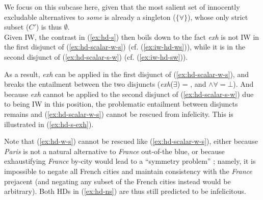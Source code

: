 	
	We focus on this subcase here, given that the most salient set of innocently excludable alternatives to \textit{some} is already a singleton ($\lbrace \forall \rbrace$), whose only strict subset ($C'$) is thus $\emptyset$.\\
	
	Given IW, the contrast in (\ref{ex:hd-s}) then boils down to the fact \textit{exh} is not IW in the first disjunct of (\ref{ex:hd-scalar-w-s}) (cf. (\ref{ex:iw-hd-ws})), while it is in the second disjunct of (\ref{ex:hd-scalar-s-w}) (cf. (\ref{ex:iw-hd-sw})).
	
	
	\begin{exe}
		\ex\label{ex:iw-hd-scalar}
		\begin{xlist}
			\label{ex:iw-hd-ws}
			\label{ex:iw-hd-sw}
		\end{xlist}
	\end{exe}
	
	As a result, \textit{exh} can be applied in the first disjunct of (\ref{ex:hd-scalar-w-s}), and breaks the entailment between the two disjuncts (\textit{exh}($\exists$) = \sbna, and \sbna $\wedge \forall = \bot$). And because \textit{exh} cannot be applied to the second disjunct of (\ref{ex:hd-scalar-s-w}) due to being IW in this position, the problematic entailment between disjuncts remains and (\ref{ex:hd-scalar-w-s}) cannot be rescued from infelicity. This is illustrated in (\ref{ex:hd-s-exh}).
	
	\begin{exe}
		\ex\label{ex:hd-s-exh}
		\begin{xlist}
			\label{ex:hd-scalar-w-s-exh}
			\label{ex:hd-scalar-s-w-exh}
		\end{xlist}
	\end{exe}
	
	Note that (\ref{ex:hd-w-s}) cannot be rescued like (\ref{ex:hd-scalar-w-s}), either because \textit{Paris} is not a natural alternative to \textit{France} out-of-the blue, or because exhaustifying \textit{France} by-city would lead to a ``symmetry problem'' \citep{Kroch1972,Fox2007}; namely, it is impossible to negate all French cities and maintain consistency with the \textit{France} prejacent (and negating any subset of the French cities instead would be arbitrary). Both HDs in (\ref{ex:hd-ns}) are thus still predicted to be infelicitous.
	
